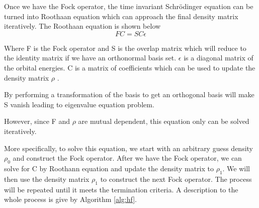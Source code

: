 \documentclass[twoside]{article}
\begin{document}
Once we have the Fock operator, the time invariant Schrödinger equation can be turned into Roothaan equation which can approach the final density matrix iteratively.
The Roothaan equation is shown below
\[
FC = SC\epsilon
\]



Where F is the Fock operator and S is the overlap matrix which will reduce to the identity matrix if we have an orthonormal basis set. $\epsilon$ is a diagonal matrix of the orbital energies. C is a matrix of coefficients which can be used to update the density matrix $\rho$ .

By performing a transformation of the basis to get an orthogonal basis will make S vanish leading to eigenvalue equation problem. 

However, since F and $\rho$ are mutual dependent, this equation only can be solved iteratively. 

More specifically, to solve this equation, we start with an arbitrary guess density $\rho_0$ and construct the Fock operator. After we have the Fock operator, we can solve for C by Roothann equation and update the density matrix to $\rho_1$. We will then use the density matrix $\rho_1$ to construct the next Fock operator. The process will be repeated until it meets the termination criteria. A description to the whole process is give by Algorithm \ref{alg:hf}.



\end{document}
